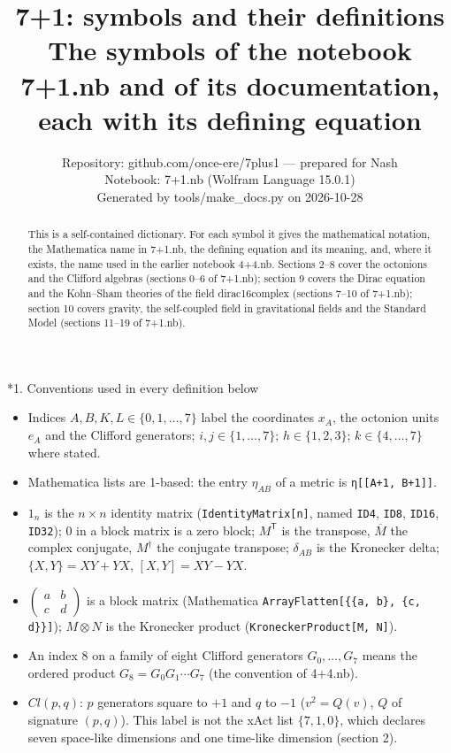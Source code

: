 \documentclass[10pt,a4paper]{article}
\makeatletter
\renewcommand\section{\@startsection{section}{1}{\z@}{-3.5ex \@plus -1ex \@minus -.2ex}{2.3ex \@plus.2ex}{\normalfont\Large\bfseries\raggedright}}
\makeatother
\begin{document}
\title{7+1: symbols and their definitions\\[0.4em]\large The symbols of the notebook 7+1.nb and of its documentation, each with its defining equation}
\author{Repository: github.com/once-ere/7plus1 — prepared for Nash\\ Notebook: 7+1.nb (Wolfram Language 15.0.1)\\ Generated by tools/make\_docs.py on 2026-10-28}
\date{}
\maketitle
\begin{abstract}
This is a self-contained dictionary. For each symbol it gives the mathematical notation, the Mathematica name in 7+1.nb, the defining equation and its meaning, and, where it exists, the name used in the earlier notebook 4+4.nb. Sections 2–8 cover the octonions and the Clifford algebras (sections 0–6 of 7+1.nb); section 9 covers the Dirac equation and the Kohn–Sham theories of the field dirac16complex (sections 7–10 of 7+1.nb); section 10 covers gravity, the self-coupled field in gravitational fields and the Standard Model (sections 11–19 of 7+1.nb).
\end{abstract}
\tableofcontents
{}\section*{1. Conventions used in every definition below}
\begin{itemize}
\item Indices $A,B,K,L\in\lbrace0,1,\dots,7\rbrace$ label the coordinates $x_A$, the octonion units $e_A$ and the Clifford generators; $i,j\in\lbrace1,\dots,7\rbrace$; $h\in\lbrace1,2,3\rbrace$; $k\in\lbrace4,\dots,7\rbrace$ where stated.
\item Mathematica lists are 1-based: the entry $\eta_{AB}$ of a metric is \texttt{η[[A+1, B+1]]}.
\item $1_n$ is the $n\times n$ identity matrix (\texttt{IdentityMatrix[n]}, named \texttt{ID4}, \texttt{ID8}, \texttt{ID16}, \texttt{ID32}); $0$ in a block matrix is a zero block; $M^{\mathsf T}$ is the transpose, $\overline M$ the complex conjugate, $M^\dagger$ the conjugate transpose; $\delta_{AB}$ is the Kronecker delta; $\lbrace X,Y\rbrace=XY+YX$, $[X,Y]=XY-YX$.
\item $\left(\begin{smallmatrix}a&b\\c&d\end{smallmatrix}\right)$ is a block matrix (Mathematica \texttt{ArrayFlatten[\{\{a, b\}, \{c, d\}\}]}); $M\otimes N$ is the Kronecker product (\texttt{KroneckerProduct[M, N]}).
\item An index 8 on a family of eight Clifford generators $G_0,\dots,G_7$ means the ordered product $G_8=G_0G_1\cdots G_7$ (the convention of 4+4.nb).
\item $Cl(p,q)$: $p$ generators square to $+1$ and $q$ to $-1$ ($v^2=Q(v)$, $Q$ of signature $(p,q)$). This label is not the xAct list $\{7,1,0\}$, which declares seven space-like dimensions and one time-like dimension (section 2).
\end{itemize}
\end{document}
